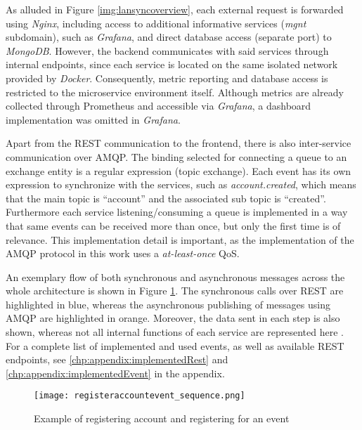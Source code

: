 As alluded in Figure \ref{img:lansyncoverview}, each external request is forwarded using \textit{Nginx}, including access to additional informative services (\textit{mgnt} subdomain), such as \textit{Grafana}, and direct database access (separate port) to \textit{MongoDB}.
However, the backend communicates with said services through internal endpoints, since each service is located on the same isolated network provided by \textit{Docker}.
Consequently, metric reporting and database access is restricted to the microservice environment itself.
Although metrics are already collected through Prometheus and accessible via \textit{Grafana}, a dashboard implementation was omitted in \textit{Grafana}.

Apart from the REST communication to the frontend, there is also inter-service communication over \ac{AMQP}.
The binding selected for connecting a queue to an exchange entity is a regular expression (topic exchange).
Each event has its own expression to synchronize with the services, such as \textit{account.created}, which means that the main topic is \enquote{account} and the associated sub topic is \enquote{created}.
Furthermore each service listening/consuming a queue is implemented in a way that same events can be received more than once, but only the first time is of relevance.
This implementation detail is important, as the implementation of the \ac{AMQP} protocol in this work uses a \textit{at-least-once} \ac{QoS}.

An exemplary flow of both synchronous and asynchronous messages across the whole architecture is shown in Figure \ref{img:registeraccountevent_sequence}.
The synchronous calls over REST are highlighted in blue, whereas the asynchronous publishing of messages using \ac{AMQP} are highlighted in orange.
Moreover, the data sent in each step is also shown, whereas not all internal functions of each service are represented here .
For a complete list of implemented and used events, as well as available REST endpoints, see \ref{chp:appendix:implementedRest} and \ref{chp:appendix:implementedEvent} in the appendix.

\begin{figure}
	\centering
	\texttt{[image: registeraccountevent\_sequence.png]}
	\caption{Example of registering account and registering for an event}
	\label{img:registeraccountevent_sequence}
\end{figure}
